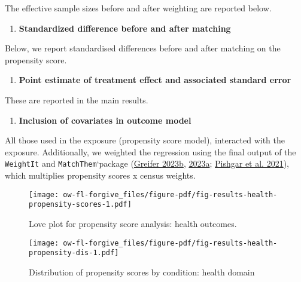 \documentclass[
  singlecolumn]{report}
\providecommand{\tightlist}{%
  \setlength{\itemsep}{0pt}\setlength{\parskip}{0pt}}\usepackage{longtable,booktabs,array}
\begin{document}
The effective sample sizes before and after weighting are reported
below.

\begin{enumerate}
\def\labelenumi{\arabic{enumi}.}
\setcounter{enumi}{8}
\tightlist
\item
  \textbf{Standardized difference before and after matching}
\end{enumerate}

Below, we report standardised differences before and after matching on
the propensity score.

\begin{enumerate}
\def\labelenumi{\arabic{enumi}.}
\setcounter{enumi}{9}
\tightlist
\item
  \textbf{Point estimate of treatment effect and associated standard
  error}
\end{enumerate}

These are reported in the main results.

\begin{enumerate}
\def\labelenumi{\arabic{enumi}.}
\setcounter{enumi}{10}
\tightlist
\item
  \textbf{Inclusion of covariates in outcome model}
\end{enumerate}

All those used in the exposure (propensity score model), interacted with
the exposure. Additionally, we weighted the regression using the final
output of the \texttt{WeightIt} and \texttt{MatchThem}`package
(\protect\hyperlink{ref-greifer2023a}{Greifer 2023b},
\protect\hyperlink{ref-greifer2023b}{2023a};
\protect\hyperlink{ref-pishgar2021}{Pishgar et al. 2021}), which
multiplies propensity scores x census weights.

\begin{figure}

{\centering \texttt{[image: ow-fl-forgive\_files/figure-pdf/fig-results-health-propensity-scores-1.pdf]}

}

\caption{\label{fig-results-health-propensity-scores}Love plot for
propensity score analysis: health outcomes.}

\end{figure}

\begin{figure}

{\centering \texttt{[image: ow-fl-forgive\_files/figure-pdf/fig-results-health-propensity-dis-1.pdf]}

}

\caption{\label{fig-results-health-propensity-dis}Distribution of
propensity scores by condition: health domain}

\end{figure}
\end{document}
